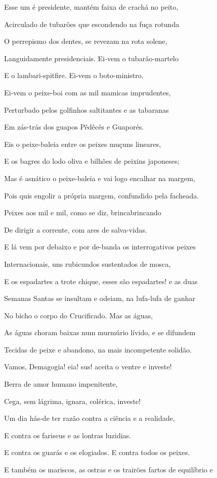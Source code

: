 Esse um é presidente, mantém faixa de crachá no peito,

Acirculado de tubarões que escondendo na fuça rotunda

O perrepismo dos dentes, se revezam na rota solene,

Languidamente presidenciais. Ei-vem o tubarão-martelo

E o lambari-spitfire. Ei-vem o boto-ministro.

Ei-vem o peixe-boi com as mil mamicas imprudentes,

Perturbado pelos golfinhos saltitantes e as tabaranas

Em zás-trás dos guapos Pêdêcês e Guaporés.

Eis o peixe-baleia entre os peixes muçuns lineares,

E os bagres do lodo oliva e bilhões de peixins japoneses;

Mas é asnático o peixe-baleia e vai logo encalhar na margem,

Pois quis engolir a própria margem, confundido pela facheada.

Peixes aos mil e mil, como se diz, brincabrincando

De dirigir a corrente, com ares de salva-vidas.

E lá vem por debaixo e por de-banda os interrogativos peixes

Internacionais, uns rubicundos sustentados de mosca,

E os espadartes a trote chique, esses são espadartes! e as duas

Semanas Santas se insultam e odeiam, na lufa-lufa de ganhar

No bicho o corpo do Crucificado. Mas as águas,

As águas choram baixas num murmúrio lívido, e se difundem

Tecidas de peixe e abandono, na mais incompetente solidão.

Vamos, Demagogia! eia! sus! aceita o ventre e investe!

Berra de amor humano impenitente,

Cega, sem lágrima, ignara, colérica, investe!

Um dia hás-de ter razão contra a ciência e a realidade,

E contra os fariseus e as lontras luzidias.

E contra os guarás e os elogiados. E contra todos os peixes.

E também os mariscos, as ostras e os trairões fartos de equilíbrio e

